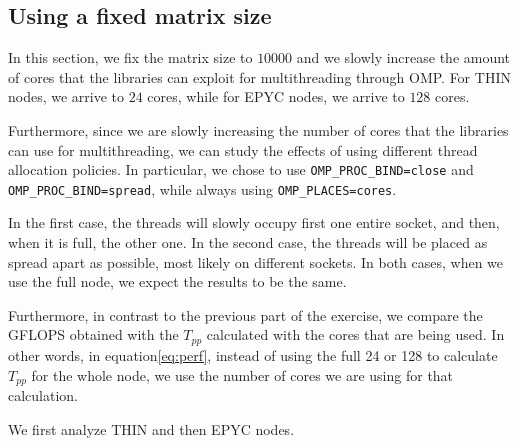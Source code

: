 \documentclass{report}
\begin{document}
\subsection{Using a fixed matrix size}

In this section, we fix the matrix size to $10000$ and we slowly increase the 
amount of cores that the libraries can exploit for multithreading through OMP. 
For THIN nodes, we arrive to $24$ cores, while for EPYC nodes, we arrive to 
$128$ cores.

Furthermore, since we are slowly increasing the number of cores that the libraries 
can use for multithreading, we can study the effects of using different 
thread allocation policies. In particular, we chose to use 
\texttt{OMP\_PROC\_BIND=close} and \texttt{OMP\_PROC\_BIND=spread}, while 
always using \texttt{OMP\_PLACES=cores}. 

In the first case, the threads will slowly occupy first one entire socket, and 
then, when it is full, the other one. In the second case, the threads will be 
placed as spread apart as possible, most likely on different sockets. 
In both cases, when we use the full node, we expect the results to be the same.

Furthermore, in contrast to the previous part of the exercise, we compare the 
GFLOPS obtained with the $T_{pp}$ calculated with the cores that are being used. 
In other words, in equation\ref{eq:perf}, instead of using the full 24 or 128 
to calculate $T_{pp}$ for the whole node, we use the number of cores we are using 
for that calculation.

We first analyze THIN and then EPYC nodes.
\end{document}
